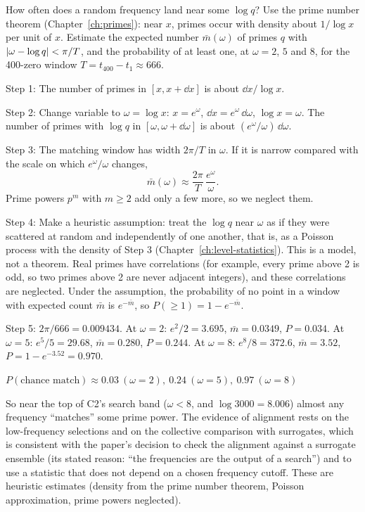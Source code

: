 \begin{sample}{How often does a random frequency land near some $\log q$?}
Use the prime number theorem (Chapter~\ref{ch:primes}): near $x$, primes occur with density about $1/\log x$ per unit of $x$. Estimate the expected number $\bar m(\omega)$ of primes $q$ with $\left\lvert \omega-\log q\right\rvert<\pi/T$, and the probability of at least one, at $\omega=2$, $5$ and $8$, for the 400-zero window $T=t_{400}-t_1\approx666$.

Step 1: The number of primes in $[x,x+\dd x]$ is about $\dd x/\log x$.

Step 2: Change variable to $\omega=\log x$: $x=e^\omega$, $\dd x=e^\omega\,\dd\omega$, $\log x=\omega$. The number of primes with $\log q$ in $[\omega,\omega+\dd\omega]$ is about $(e^\omega/\omega)\,\dd\omega$.

Step 3: The matching window has width $2\pi/T$ in $\omega$. If it is narrow compared with the scale on which $e^\omega/\omega$ changes,
\begin{equation}
\bar m(\omega)\approx\frac{2\pi}{T}\,\frac{e^\omega}{\omega}.
\label{eq:paper-critique-density}
\end{equation}
Prime powers $p^m$ with $m\ge2$ add only a few more, so we neglect them.

Step 4: Make a heuristic assumption: treat the $\log q$ near $\omega$ as if they were scattered at random and independently of one another, that is, as a Poisson process with the density of Step 3 (Chapter~\ref{ch:level-statistics}). This is a model, not a theorem. Real primes have correlations (for example, every prime above 2 is odd, so two primes above 2 are never adjacent integers), and these correlations are neglected. Under the assumption, the probability of no point in a window with expected count $\bar m$ is $e^{-\bar m}$, so $P(\ge1)=1-e^{-\bar m}$.

Step 5: $2\pi/666=0.009434$. At $\omega=2$: $e^2/2=3.695$, $\bar m=0.0349$, $P=0.034$. At $\omega=5$: $e^5/5=29.68$, $\bar m=0.280$, $P=0.244$. At $\omega=8$: $e^8/8=372.6$, $\bar m=3.52$, $P=1-e^{-3.52}=0.970$.

$\boxed{P(\text{chance match})\approx0.03\ (\omega=2),\ 0.24\ (\omega=5),\ 0.97\ (\omega=8)}$

So near the top of C2's search band ($\omega<8$, and $\log3000=8.006$) almost any frequency ``matches'' some prime power. The evidence of alignment rests on the low-frequency selections and on the collective comparison with surrogates, which is consistent with the paper's decision to check the alignment against a surrogate ensemble (its stated reason: ``the frequencies are the output of a search'') and to use a statistic that does not depend on a chosen frequency cutoff. These are heuristic estimates (density from the prime number theorem, Poisson approximation, prime powers neglected).
\end{sample}

